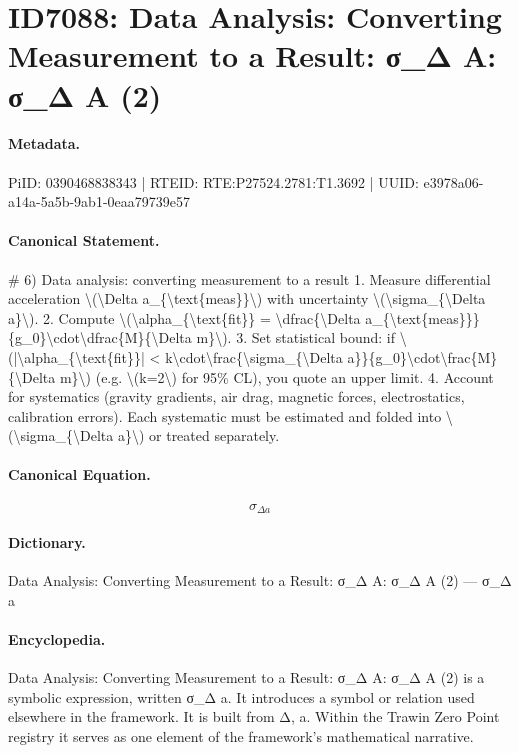 \section*{ID7088: Data Analysis: Converting Measurement to a Result: σ\_Δ A: σ\_Δ A (2)}
\paragraph{Metadata.}
PiID: 0390468838343 | RTEID: RTE:P27524.2781:T1.3692 | UUID: e3978a06-a14a-5a5b-9ab1-0eaa79739e57

\paragraph{Canonical Statement.}
\# 6) Data analysis: converting measurement to a result 1. Measure differential acceleration \textbackslash{}(\textbackslash{}Delta a\_\{\textbackslash{}text\{meas\}\}\textbackslash{}) with uncertainty \textbackslash{}(\textbackslash{}sigma\_\{\textbackslash{}Delta a\}\textbackslash{}). 2. Compute \textbackslash{}(\textbackslash{}alpha\_\{\textbackslash{}text\{fit\}\} = \textbackslash{}dfrac\{\textbackslash{}Delta a\_\{\textbackslash{}text\{meas\}\}\}\{g\_0\}\textbackslash{}cdot\textbackslash{}dfrac\{M\}\{\textbackslash{}Delta m\}\textbackslash{}). 3. Set statistical bound: if \textbackslash{}(|\textbackslash{}alpha\_\{\textbackslash{}text\{fit\}\}| < k\textbackslash{}cdot\textbackslash{}frac\{\textbackslash{}sigma\_\{\textbackslash{}Delta a\}\}\{g\_0\}\textbackslash{}cdot\textbackslash{}frac\{M\}\{\textbackslash{}Delta m\}\textbackslash{}) (e.g. \textbackslash{}(k=2\textbackslash{}) for 95\% CL), you quote an upper limit. 4. Account for systematics (gravity gradients, air drag, magnetic forces, electrostatics, calibration errors). Each systematic must be estimated and folded into \textbackslash{}(\textbackslash{}sigma\_\{\textbackslash{}Delta a\}\textbackslash{}) or treated separately.

\paragraph{Canonical Equation.}
\[
\sigma_{\Delta a}
\]

\paragraph{Dictionary.}
Data Analysis: Converting Measurement to a Result: σ\_Δ A: σ\_Δ A (2) — σ\_Δ a

\paragraph{Encyclopedia.}
Data Analysis: Converting Measurement to a Result: σ\_Δ A: σ\_Δ A (2) is a symbolic expression, written σ\_Δ a. It introduces a symbol or relation used elsewhere in the framework. It is built from Δ, a. Within the Trawin Zero Point registry it serves as one element of the framework's mathematical narrative.
